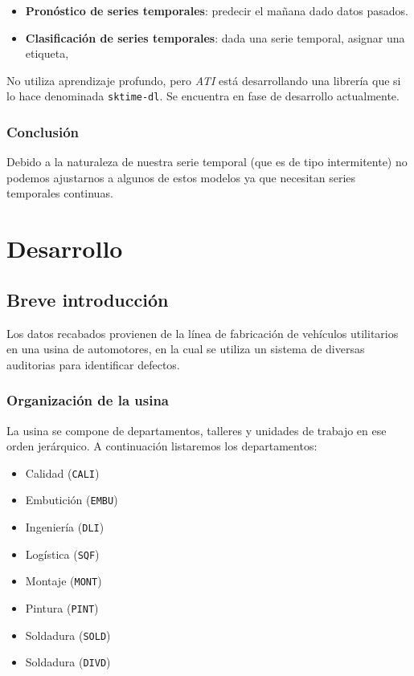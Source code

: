 \documentclass[a4paper,12pt]{article}
\begin{document}
\begin{itemize}
	\item \textbf{Pronóstico de series temporales}: predecir el mañana dado datos pasados.
	\item \textbf{Clasificación de series temporales}: dada una serie temporal, asignar una etiqueta,
\end{itemize}

No utiliza aprendizaje profundo, pero \textit{ATI} está desarrollando una librería que si lo hace denominada \texttt{sktime-dl}. Se encuentra en fase de desarrollo actualmente.

\subsubsection{Conclusión}

Debido a la naturaleza de nuestra serie temporal (que es de tipo intermitente) no podemos ajustarnos a algunos de estos modelos ya que necesitan series temporales continuas.

\section{Desarrollo}

\subsection{Breve introducción}
Los datos recabados provienen de la línea de fabricación de vehículos utilitarios en una usina de automotores, en la cual se utiliza un sistema de diversas auditorias para identificar defectos.

\subsubsection{Organización de la usina}
La usina se compone de departamentos, talleres y unidades de trabajo en ese orden jerárquico. A continuación listaremos los departamentos:

\begin{itemize}
	\item Calidad (\texttt{CALI})
	\item Embutición (\texttt{EMBU})
	\item Ingeniería (\texttt{DLI})
	\item Logística (\texttt{SQF})
	\item Montaje (\texttt{MONT})
	\item Pintura (\texttt{PINT})
	\item Soldadura (\texttt{SOLD})
	\item Soldadura (\texttt{DIVD})
\end{itemize}
\end{document}
